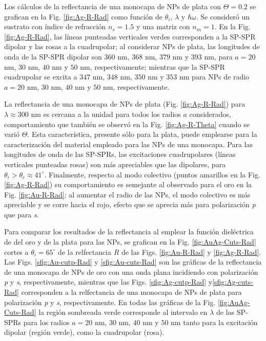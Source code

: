 Los cálculos de la reflectancia de una monocapa de NPs de plata con $\Theta= 0.2$ se grafican en la Fig. \ref{fig:Ag-R-Rad} como función de $\theta_i$, $\lambda$ y $\hbar\omega$. Se consideró un sustrato con índice de refracción $n_s=1.5$ y una matriz con $n_m=1$. En la Fig. \ref{fig:Ag-R-Rad}, las líneas punteadas verticales verdes corresponden a la SP-SPR dipolar y las rosas a la cuadrupolar; al considerar NPs de plata, las longitudes de onda de la SP-SPR dipolar son $360$ nm, $368$ nm, $379$ nm y $393$ nm, para $a = 20$ nm, $30$ nm, $40$ nm y $50$ nm, respectivamente; mientras que  la SP-SPR cuadrupolar se excita a $347$ nm, $348$ nm, $350$ nm y $353$ nm para NPs de radio $a = 20$ nm, $30$ nm, $40$ nm y $50$ nm, respectivamente.

La reflectancia de una monocapa de NPs de plata (Fig. \ref{fig:Ag-R-Rad}) para $\lambda\approx 300$ nm es cercana a la unidad para todos los radios $a$ considerados, comportamiento que también se observó en la Fig. \ref{fig:Ag-R-Theta} cuando se varió $\Theta$. Esta característica, presente sólo para la plata, puede emplearse para la caracterización del material empleado para las NPs de una monocapa. Para las longitudes de onda de las SP-SPRs, las excitaciones cuadrupolares (líneas verticales punteadas rosas) son más apreciables que las dipolares, para $\theta_i>\theta_c\approx 41^\circ$. Finalmente, respecto al  modo colectivo (puntos amarillos en la Fig. \ref{fig:Ag-R-Rad}) su comportamiento es semejante al observado para el oro en la Fig. \ref{fig:Au-R-Rad}: al aumentar el radio de las NPs, el modo colectivo es más apreciable y se corre hacia el rojo, efecto que se aprecia más para polarización \emph{p} que para \emph{s}.

Para comparar los resultados de la reflectancia al emplear la función dieléctrica de del oro y de la plata para las NPs, se grafican en la Fig. \ref{fig:AuAg-Cuts-Rad} cortes a $\theta_i = 65^\circ$ de la relfectancia $R$ de las Figs. \ref{fig:Au-R-Rad} y \ref{fig:Ag-R-Rad}. Las Figs. \ref{sfig:Au-cutp-Rad} y \ref{sfig:Au-cuts-Rad} son las gráficas de la reflectancia de una monocapa de NPs de oro con una onda plana incidiendo con polarización \emph{p} y \emph{s}, respectivamente, mientras que las Figs.  \ref{sfig:Ag-cutp-Rad} y\ref{sfig:Ag-cuts-Rad}  corresponden a la relfectancia de una monocapa de NPs de plata para polarización \emph{p} y \emph{s}, respectivamente. En todas las gráficas de la Fig. \ref{fig:AuAg-Cuts-Rad} la región sombreada verde corresponde al intervalo en $\lambda$ de las SP-SPRs para los radios $a=20$ nm, $30$ nm, $40$ nm y $50$ nm tanto para la excitación dipolar (región verde), como la cuadrupolar (rosa). 

